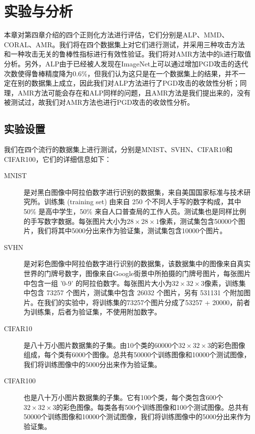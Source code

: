 \chapter{实验与分析}

本章对第四章介绍的四个正则化方法进行评估，它们分别是ALP、MMD、CORAL、AMR。我们将在四个数据集上对它们进行测试，并采用三种攻击方法和一种攻击无关的鲁棒性指标进行有效性验证。我们将对AMR方法中的k进行取值分析。另外，ALP由于已经被人发现在ImageNet上可以通过增加PGD攻击的迭代次数使得鲁棒精度降为0.6\%\cite{engstrom2018evaluating}，但我们认为这只是在一个数据集上的结果，并不一定在别的数据集上成立，因此我们对ALP方法进行了PGD攻击的收敛性分析；同理，AMR方法可能会存在和ALP同样的问题，且AMR方法是我们提出来的，没有被测试过，故我们对AMR方法也进行PGD攻击的收敛性分析。

\section{实验设置}

我们在四个流行的数据集上进行测试，分别是MNIST\cite{lecun1998mnist}、SVHN\cite{netzer2011reading}、CIFAR10和CIFAR100\cite{krizhevsky2009learning}，它们的详细信息如下：
\begin{description}
    \item[MNIST] 是对黑白图像中阿拉伯数字进行识别的数据集，来自美国国家标准与技术研究所。训练集 (training set) 由来自 250 个不同人手写的数字构成，其中 50\% 是高中学生，50\% 来自人口普查局的工作人员。测试集也是同样比例的手写数字数据。每张图片大小为$28\times28\times1$像素，测试集包含50000个图片，我们将其中5000分出来作为验证集，测试集包含10000个图片。
    \item[SVHN] 是对彩色图像中阿拉伯数字进行识别的数据集，该数据集中的图像来自真实世界的门牌号数字，图像来自Google街景中所拍摄的门牌号图片，每张图片中包含一组 '0-9' 的阿拉伯数字。每张图片大小为$32\times32\times3$像素，训练集中包含 73257 个图片，测试集中包含 26032 个图片，另有 531131 个附加图片。在我们的实验中，将训练集的73257个图片分成了53257 + 20000，前者为训练集，后者为验证集，不使用附加数字。
    \item[CIFAR10] 是八十万小图片数据集的子集。由10个类的60000个$32\times32\times3$的彩色图像组成，每个类有6000个图像。总共有50000个训练图像和10000个测试图像，我们将训练图像中的5000分出来作为验证集。
    \item[CIFAR100] 也是八十万小图片数据集的子集。它有100个类，每个类包含600个$32\times32\times3$的彩色图像。每类各有500个训练图像和100个测试图像。总共有50000个训练图像和10000个测试图像，我们将训练图像中的5000分出来作为验证集。
\end{description} 

